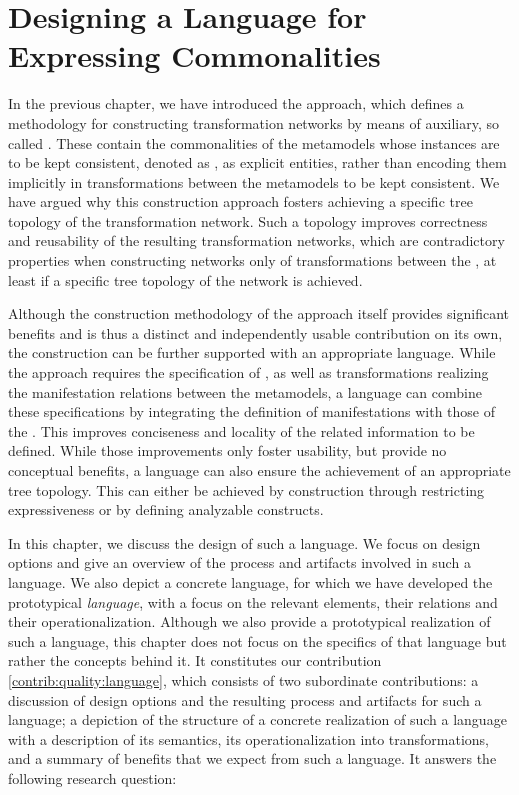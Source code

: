 \chapter{Designing a Language for Expressing Commonalities 
}
\label{chap:language}

In the previous chapter, we have introduced the \commonalities approach, which defines a methodology for constructing transformation networks by means of auxiliary, so called \conceptmetamodels.
These \conceptmetamodels contain the commonalities of the metamodels whose instances are to be kept consistent, denoted as \concretemetamodels, as explicit entities, rather than encoding them implicitly in transformations between the metamodels to be kept consistent.
We have argued why this construction approach fosters achieving a specific tree topology of the transformation network.
Such a topology improves correctness and reusability of the resulting transformation networks, which are contradictory properties when constructing networks only of transformations between the \concretemetamodels, at least if a specific tree topology of the network is achieved.

Although the construction methodology of the \commonalities approach itself provides significant benefits and is thus a distinct and independently usable contribution on its own, the construction can be further supported with an appropriate language.
While the approach requires the specification of \conceptmetamodels, as well as transformations realizing the manifestation relations between the metamodels, a language can combine these specifications by integrating the definition of manifestations with those of the \commonalities.
This improves conciseness and locality of the related information to be defined.
While those improvements only foster usability, but provide no conceptual benefits, a language can also ensure the achievement of an appropriate tree topology.
This can either be achieved by construction through restricting expressiveness or by defining analyzable constructs.

In this chapter, we discuss the design of such a language.
We focus on design options and give an overview of the process and artifacts involved in such a language.
We also depict a concrete language, for which we have developed the prototypical \emph{\commonalities language}, with a focus on the relevant elements, their relations and their operationalization.
Although we also provide a prototypical realization of such a language, this chapter does not focus on the specifics of that language but rather the concepts behind it.
It constitutes our contribution \autoref{contrib:quality:language}, which consists of two subordinate contributions: a discussion of design options and the resulting process and artifacts for such a language; a depiction of the structure of a concrete realization of such a language with a description of its semantics, its operationalization into transformations, and a summary of benefits that we expect from such a language.
It answers the following research question:


